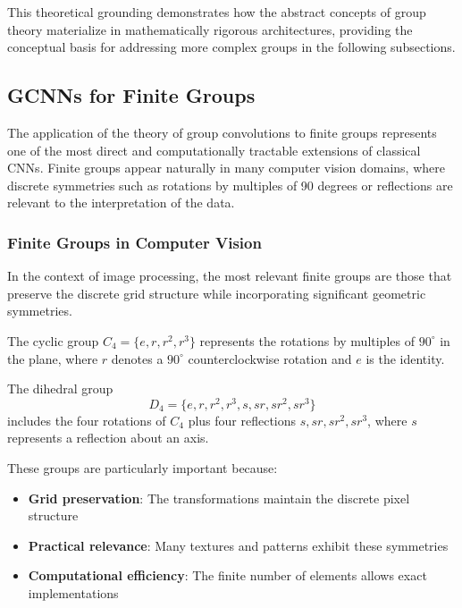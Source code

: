 This theoretical grounding demonstrates how the abstract concepts of group theory materialize in mathematically rigorous architectures, providing the conceptual basis for addressing more complex groups in the following subsections.

\subsection[GCNNs for Finite Groups]{\glspl{GCNN} for Finite Groups}\label{subsec:gcnns_grupos_finitos}

The application of the theory of group convolutions to finite groups represents one of the most direct and computationally tractable extensions of classical \glspl{CNN}. Finite groups appear naturally in many computer vision domains, where discrete symmetries such as rotations by multiples of 90 degrees or reflections are relevant to the interpretation of the data.

\subsubsection{Finite Groups in Computer Vision}

In the context of image processing, the most relevant finite groups are those that preserve the discrete grid structure while incorporating significant geometric symmetries.

\begin{definition}
The cyclic group $C_4 = \{e, r, r^2, r^3\}$ represents the rotations by multiples of $90^\circ$ in the plane, where $r$ denotes a $90^\circ$ counterclockwise rotation and $e$ is the identity.
\end{definition}

\begin{definition}
The dihedral group
\[
D_4 = \{e, r, r^2, r^3, s, sr, sr^2, sr^3\}
\]
includes the four rotations of $C_4$ plus four reflections $s, sr, sr^2, sr^3$, where $s$ represents a reflection about an axis.
\end{definition}

These groups are particularly important because:
\begin{itemize}
    \item \textbf{Grid preservation}: The transformations maintain the discrete pixel structure
    \item \textbf{Practical relevance}: Many textures and patterns exhibit these symmetries
    \item \textbf{Computational efficiency}: The finite number of elements allows exact implementations
\end{itemize}

